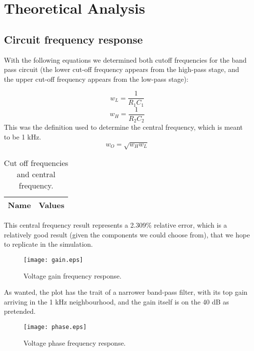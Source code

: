 \section{Theoretical Analysis}
\label{sec:analysis}
\subsection{Circuit frequency response}
With the following equations we determined both cutoff frequencies for the band pass circuit (the lower cut-off frequency appears from the high-pass stage, and the upper cut-off frequency appears from the low-pass stage):

\begin{equation}
w_L=\frac{1}{R_{1}C_{1}}
\end{equation}
\begin{equation}
w_H=\frac{1}{R_{2}C_{2}}
\end{equation}
This was the definition used to determine the central frequency, which is meant to be 1 kHz.
\begin{equation}
w_O=\sqrt{w_{H}w_{L}}
\end{equation}

\begin{table}[h!]
  \centering
  \begin{tabular}{|l|r|}
    \hline    
    {\bf Name} & {\bf Values} \\ \hline
     
  \end{tabular}
  \caption{Cut off frequencies and central frequency.}
  \label{tab:data}
\end{table}

This central frequency result represents a 2.309\% relative error, which is a relatively good result (given the components we could choose from), that we hope to replicate in the simulation.

\begin{figure}[h!] \centering
\texttt{[image: gain.eps]}
\caption{Voltage gain frequency response.}
\label{fig:gainfreq}
\end{figure}

As wanted, the plot has the trait of a narrower band-pass filter, with its top gain arriving in the 1 kHz neighbourhood, and the gain itself is on the 40 dB as pretended.

\begin{figure}[h!] \centering
\texttt{[image: phase.eps]}
\caption{Voltage phase frequency response.}
\label{fig:gainfreq}
\end{figure}

